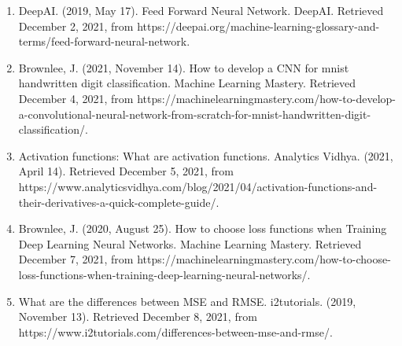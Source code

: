 \documentclass[twoside,twocolumn]{article}
\begin{document}
\begin{scriptsize}
\begin{enumerate}
    \item DeepAI. (2019, May 17). Feed Forward Neural Network. DeepAI. Retrieved December 2, 2021, from https://deepai.org/machine-learning-glossary-and-terms/feed-forward-neural-network. \\
    
    \item Brownlee, J. (2021, November 14). How to develop a CNN for mnist handwritten digit classification. Machine Learning Mastery. Retrieved December 4, 2021, from https://machinelearningmastery.com/how-to-develop-a-convolutional-neural-network-from-scratch-for-mnist-handwritten-digit-classification/. \\
    
    \item Activation functions: What are activation functions. Analytics Vidhya. (2021, April 14). Retrieved December 5, 2021, from https://www.analyticsvidhya.com/blog/2021/04/activation-functions-and-their-derivatives-a-quick-complete-guide/. \\
    
    \item Brownlee, J. (2020, August 25). How to choose loss functions when Training Deep Learning Neural Networks. Machine Learning Mastery. Retrieved December 7, 2021, from https://machinelearningmastery.com/how-to-choose-loss-functions-when-training-deep-learning-neural-networks/. \\
    
    \item What are the differences between MSE and RMSE. i2tutorials. (2019, November 13). Retrieved December 8, 2021, from https://www.i2tutorials.com/differences-between-mse-and-rmse/.
\end{enumerate}
\end{scriptsize}
\end{document}
